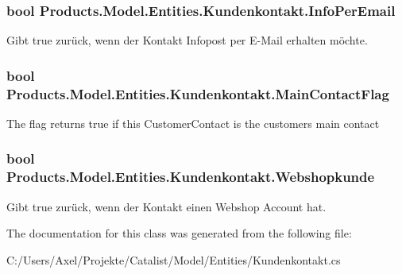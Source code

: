 \subsubsection[{\texorpdfstring{Info\+Per\+Email}{InfoPerEmail}}]{\setlength{\rightskip}{0pt plus 5cm}bool Products.\+Model.\+Entities.\+Kundenkontakt.\+Info\+Per\+Email\hspace{0.3cm}{\ttfamily [get]}}\hypertarget{class_products_1_1_model_1_1_entities_1_1_kundenkontakt_aef744b312d1fecafbc7494ed184e7955}{}\label{class_products_1_1_model_1_1_entities_1_1_kundenkontakt_aef744b312d1fecafbc7494ed184e7955}


Gibt true zurück, wenn der Kontakt Infopost per E-\/\+Mail erhalten möchte. 

\subsubsection[{\texorpdfstring{Main\+Contact\+Flag}{MainContactFlag}}]{\setlength{\rightskip}{0pt plus 5cm}bool Products.\+Model.\+Entities.\+Kundenkontakt.\+Main\+Contact\+Flag\hspace{0.3cm}{\ttfamily [get]}}\hypertarget{class_products_1_1_model_1_1_entities_1_1_kundenkontakt_a2fc6b39ee4933d40887a9f7cde128833}{}\label{class_products_1_1_model_1_1_entities_1_1_kundenkontakt_a2fc6b39ee4933d40887a9f7cde128833}


The flag returns true if this Customer\+Contact is the customer\textquotesingle{}s main contact 

\subsubsection[{\texorpdfstring{Webshopkunde}{Webshopkunde}}]{\setlength{\rightskip}{0pt plus 5cm}bool Products.\+Model.\+Entities.\+Kundenkontakt.\+Webshopkunde\hspace{0.3cm}{\ttfamily [get]}}\hypertarget{class_products_1_1_model_1_1_entities_1_1_kundenkontakt_a65ba0f1ffe5bc8ab1fe6edaa8a94cd3a}{}\label{class_products_1_1_model_1_1_entities_1_1_kundenkontakt_a65ba0f1ffe5bc8ab1fe6edaa8a94cd3a}


Gibt true zurück, wenn der Kontakt einen Webshop Account hat. 



The documentation for this class was generated from the following file\+:\begin{DoxyCompactItemize}
\item 
C\+:/\+Users/\+Axel/\+Projekte/\+Catalist/\+Model/\+Entities/Kundenkontakt.\+cs\end{DoxyCompactItemize}
